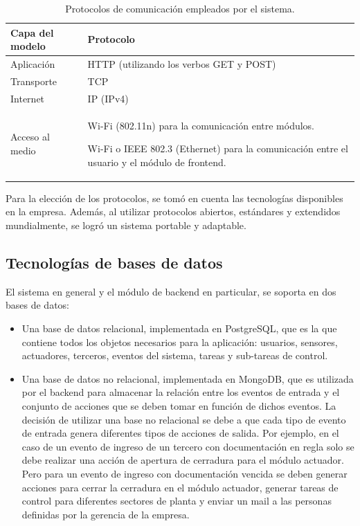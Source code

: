 \begin{table}[h]
	\centering
	\caption[Protocolos comunicación]{Protocolos de comunicación empleados por el sistema.}
	\begin{tabular}{p{3.5cm} p{8.5cm} } 	

		\toprule
		\textbf{Capa del modelo} & 
		\textbf{Protocolo}
		\\
		\midrule

Aplicación & HTTP (utilizando los verbos GET y POST)\\ 
Transporte & TCP\\
Internet & IP (IPv4)\\
Acceso al medio & Wi-Fi (802.11n) para la comunicación entre módulos.

Wi-Fi o IEEE 802.3 (Ethernet) para la comunicación entre el usuario y el módulo de frontend.\\
		\bottomrule
		\hline
	\end{tabular}
	\label{tab:protocolosComunicacionCap3}
\end{table}

Para la elección de los protocolos, se tomó en cuenta las tecnologías disponibles en la empresa. Además, al utilizar protocolos abiertos, estándares y extendidos mundialmente, se logró un sistema portable y adaptable.

\subsection{Tecnologías de bases de datos}

El sistema en general y el módulo de backend en particular, se soporta en dos bases de datos:

\begin{itemize}
\item Una base de datos relacional, implementada en PostgreSQL, que es la que contiene todos los objetos necesarios para la aplicación: usuarios, sensores, actuadores, terceros, eventos del sistema, tareas y sub-tareas de control. 
\item Una base de datos no relacional, implementada en MongoDB, que es utilizada por el backend para almacenar la relación entre los eventos de entrada y el conjunto de acciones que se deben tomar en función de dichos eventos. La decisión de utilizar una base no relacional se debe a que cada tipo de evento de entrada genera diferentes tipos de acciones de salida. Por ejemplo, en el caso de un evento de ingreso de un tercero con documentación en regla solo se debe realizar una acción de apertura de cerradura para el módulo actuador. Pero para un evento de ingreso con documentación vencida se deben generar acciones para cerrar la cerradura en el módulo actuador, generar tareas de control para diferentes sectores de planta y enviar un mail a las personas definidas por la gerencia de la empresa. 

\end{itemize}

